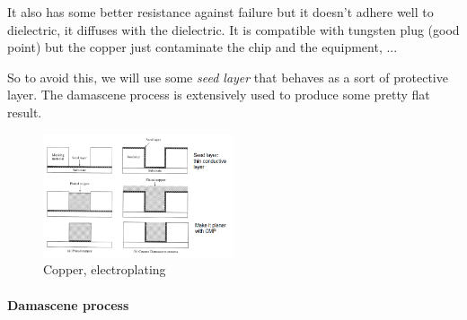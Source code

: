 \documentclass[
]{article}
\begin{document}
It also has some better resistance against failure but it doesn't adhere
well to dielectric, it diffuses with the dielectric. It is compatible
with tungsten plug (good point) but the copper just contaminate the chip
and the equipment, ...

So to avoid this, we will use some \emph{seed layer} that behaves as a
sort of protective layer. The damascene process is extensively used to
produce some pretty flat result.

\begin{figure}
\hypertarget{fig:enter-label}{%
\centering
\includegraphics[width=0.5\textwidth,height=\textheight]{electroplating.png}
\caption{Copper, electroplating}\label{fig:enter-label}
}
\end{figure}

\hypertarget{damascene-process}{%
\paragraph{Damascene process}\label{damascene-process}}
\end{document}
